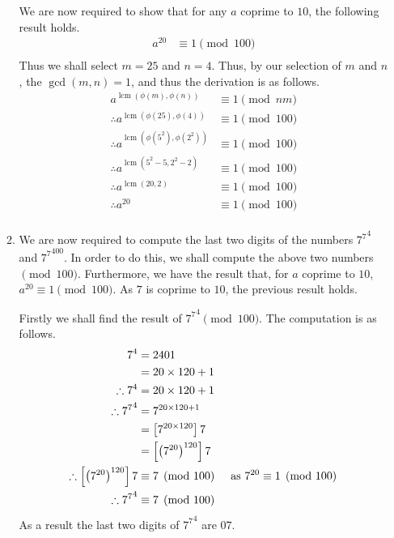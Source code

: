 \documentclass[a4paper]{article}
\DeclareMathOperator\lcm{lcm}
\begin{document}
\begin{enumerate}
\begin{enumerate}
		\pagebreak

		We are now required to show that for any $\displaystyle{a}$ coprime to $\displaystyle{10}$, the following result holds.
		\begin{align*}
		a^{20} & \equiv 1 \pmod{100}\\
		\end{align*}
		Thus we shall select $\displaystyle{m = 25}$ and $\displaystyle{n=4}$. Thus, by our selection of $\displaystyle{m}$ and $\displaystyle{n}$, the $\displaystyle{\gcd(m,n) = 1}$, and thus the derivation is as follows.
		\begin{align*}
		a^{\lcm\left(\phi(m),\phi(n) \right)} & \equiv 1 \pmod{nm}\\
		\therefore a^{\lcm\left(\phi(25),\phi(4) \right)} & \equiv 1 \pmod{100}\\
		\therefore a^{\lcm\left(\phi(5^2),\phi(2^2) \right)} & \equiv 1 \pmod{100}\\
		\therefore a^{\lcm\left(5^2-5,2^2-2 \right)} & \equiv 1 \pmod{100}\\
		\therefore a^{\lcm\left(20,2 \right)} & \equiv 1 \pmod{100}\\
		\therefore a^{20} & \equiv 1 \pmod{100}\\
		\end{align*} 

		\bigbreak

		\item We are now required to compute the last two digits of the numbers $\displaystyle{{7^{7}}^4}$ and $\displaystyle{{7^{7}}^{400}}$. In order to do this, we shall compute the above two numbers $\displaystyle{\pmod{100}}$. Furthermore, we have the result that, for $\displaystyle{a}$ coprime to $\displaystyle{10}$, $\displaystyle{a^{20} \equiv 1 \pmod{100}}$. As $\displaystyle{7}$ is coprime to $\displaystyle{10}$, the previous result holds. 

		\bigbreak

		Firstly we shall find the result of $\displaystyle{{7^{7}}^4 \pmod{100}}$. The computation is as follows.
		\begin{align*}
		7^4 & = 2401\\
		& = 20\times120 + 1\\
		\therefore 7^4 & = 20\times120 + 1\\
		\therefore {7^7}^4 & = 7^{20\times120 + 1}\\
		& = \left[7^{20\times120} \right]7\\
		& = \left[\left(7^{20}\right)^{120} \right]7\\
		\therefore \left[\left(7^{20}\right)^{120} \right]7 & \equiv 7 \pmod{100} \hspace{5mm} \text{as } 7^{20} \equiv 1 \pmod{100}\\
		\therefore {7^7}^4 & \equiv 7 \pmod{100}\\
		\end{align*}
		As a result the last two digits of $\displaystyle{{7^{7}}^4}$ are $\displaystyle{07}$.


\end{enumerate}
\end{enumerate}
\end{document}
